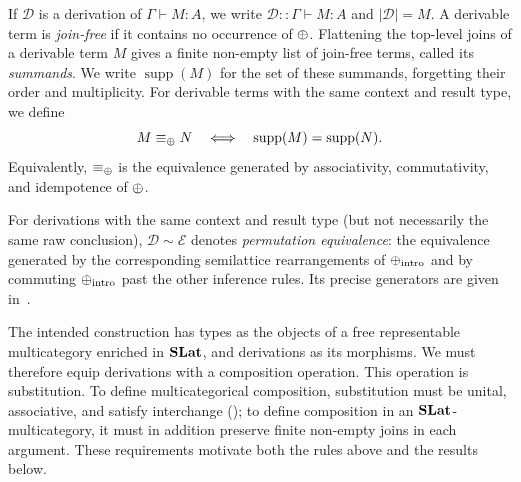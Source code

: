 \begin{definition}
If $\mathcal D$ is a derivation of $\Gamma\vdash M:A$, we write
$\mathcal D::\Gamma\vdash M:A$ and $|\mathcal D|=M$.  A derivable term is
\emph{join-free} if it contains no occurrence of $\mathbin{\oplus}$.  Flattening the
top-level joins of a derivable term $M$ gives a finite non-empty list of
join-free terms, called its \emph{summands}.  We write
$\operatorname{supp}(M)$ for the set of these summands, forgetting their order
and multiplicity.  For derivable terms with the same context and result type,
we define
\[
M\equiv_{\mathbin{\oplus}}N
\quad\Longleftrightarrow\quad
\operatorname{supp}(M)=\operatorname{supp}(N).
\]
Equivalently, $\equiv_{\mathbin{\oplus}}$ is the equivalence generated by associativity,
commutativity, and idempotence of $\mathbin{\oplus}$.

For derivations with the same context and result type (but not necessarily the
same raw conclusion), $\mathcal D\sim\mathcal E$ denotes
\emph{permutation equivalence}: the equivalence generated by the corresponding
semilattice rearrangements of $\mathbin{\oplus}_{\mathrm{intro}}$ and by commuting
$\mathbin{\oplus}_{\mathrm{intro}}$ past the other inference rules.  Its precise
generators are given in~.
\end{definition}

The intended construction has types as the objects of a free representable
multicategory enriched in $\mathbf{SLat}$, and derivations as its morphisms.  We must
therefore equip derivations with a composition operation.  This operation is
substitution.  To define multicategorical composition, substitution must be
unital, associative, and satisfy interchange
(); to define composition in an
$\mathbf{SLat}$-multicategory, it must in addition preserve finite non-empty
joins in each argument.  These requirements motivate both the rules above and
the results below.

